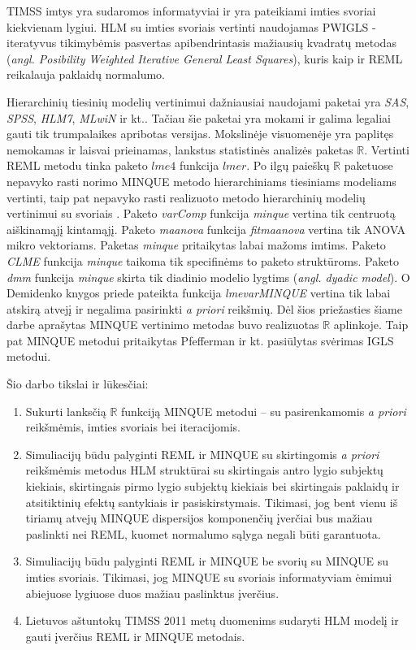 \documentclass[11pt,a4paper]{article}
\newcommand{\R}{{\mathbb R}}
\begin{document}
\indent TIMSS imtys yra sudaromos informatyviai ir yra pateikiami imties svoriai kiekvienam lygiui\cite{2011Sample}. HLM su imties svoriais vertinti naudojamas PWIGLS - iteratyvus tikimybėmis pasvertas apibendrintasis mažiausių kvadratų metodas (\textit{angl. Posibility Weighted Iterative General Least Squares}), kuris kaip ir REML reikalauja paklaidų normalumo.

\indent Hierarchinių tiesinių modelių vertinimui dažniausiai naudojami paketai yra \textit{SAS}, \textit{SPSS}, \textit{HLM7}, \textit{MLwiN} ir kt.. Tačiau šie paketai yra mokami ir galima legaliai gauti tik trumpalaikes apribotas versijas. Mokslinėje visuomenėje yra paplitęs nemokamas ir laisvai prieinamas, lankstus statistinės analizės paketas $\R$. Vertinti REML metodu tinka paketo $lme4$ funkcija $lmer$. Po ilgų paieškų $\R$ paketuose nepavyko rasti norimo MINQUE metodo hierarchiniams tiesiniams modeliams vertinti, taip pat nepavyko rasti realizuoto metodo hierarchinių modelių vertinimui su svoriais . Paketo \textit{varComp} funkcija \textit{minque} vertina tik centruotą aiškinamąjį kintamąjį. Paketo \textit{maanova} funkcija \textit{fitmaanova} vertina tik ANOVA mikro vektoriams. Paketas \textit{minque} pritaikytas labai mažoms imtims. Paketo \textit{CLME} funkcija \textit{minque} taikoma tik specifinėms to paketo struktūroms. Paketo \textit{dmm} funkcija \textit{minque} skirta  tik diadinio modelio lygtims (\textit{angl. dyadic model}). O Demidenko knygos \cite{mixedR} priede pateikta funkcija \textit{lmevarMINQUE} vertina tik labai atskirą atvejį ir negalima pasirinkti \textit{a priori} reikšmių. Dėl šios priežasties šiame darbe aprašytas MINQUE vertinimo metodas buvo realizuotas $\R$ aplinkoje. Taip pat MINQUE metodui pritaikytas Pfefferman ir kt.\cite{pfeff} pasiūlytas svėrimas IGLS metodui.

\indent Šio darbo tikslai ir lūkesčiai:
\begin{enumerate}
\item Sukurti lanksčią $\R$ funkciją MINQUE metodui -- su pasirenkamomis \textit{a priori} reikšmėmis,  imties svoriais bei iteracijomis.
\item Simuliacijų būdu palyginti REML ir MINQUE su skirtingomis \textit{a priori} reikšmėmis metodus HLM struktūrai su skirtingais antro lygio subjektų kiekiais, skirtingais pirmo lygio subjektų kiekiais bei skirtingais paklaidų ir atsitiktinių efektų santykiais ir pasiskirstymais. Tikimasi, jog bent vienu iš tiriamų atvejų MINQUE dispersijos komponenčių įverčiai bus mažiau paslinkti nei REML, kuomet normalumo sąlyga negali būti garantuota.
\item Simuliacijų būdu palyginti REML ir MINQUE be svorių su MINQUE su imties svoriais. Tikimasi, jog MINQUE su svoriais informatyviam ėmimui abiejuose lygiuose duos mažiau paslinktus įverčius.
\item Lietuvos aštuntokų TIMSS 2011 metų duomenims sudaryti HLM modelį ir gauti įverčius REML ir MINQUE metodais.
\end{enumerate}
\end{document}
